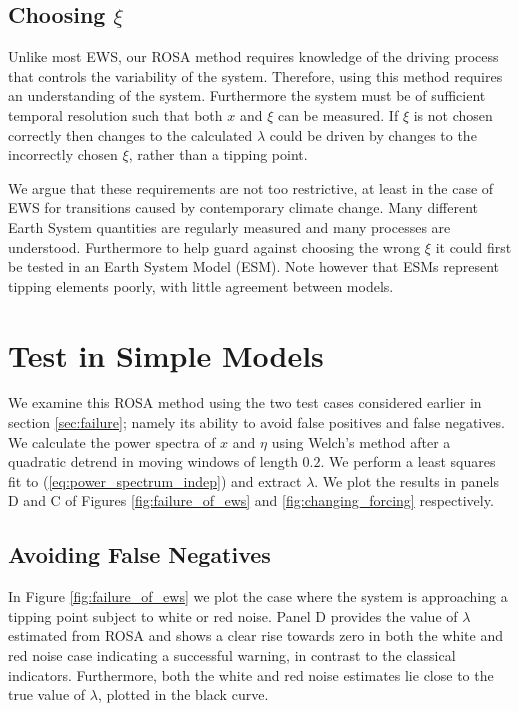 \subsection{Choosing $\xi$}
Unlike most EWS, our ROSA method requires knowledge of
the driving process that controls the variability of the system.
Therefore, using this method requires an understanding
of the system. Furthermore the system must be of sufficient temporal resolution such that 
both $x$ and $\xi$ can be measured. If $\xi$ is not chosen
correctly then changes to the calculated $\lambda$ could be driven
by changes to the incorrectly chosen $\xi$, rather than a 
tipping point. 

We argue that these requirements are not too restrictive, at least in the 
case of EWS for transitions caused by contemporary
climate change. Many different Earth System quantities are regularly 
measured and many processes are understood. Furthermore to help 
guard against choosing the wrong $\xi$ it could first be tested in an Earth System Model (ESM). Note however that ESMs represent tipping elements 
poorly, with little agreement between models\cite{Drijfhout2015}.


\section{Test in Simple Models}
We examine this ROSA method using the two test cases considered earlier in 
section \cref{sec:failure}; namely its ability to avoid 
false positives and false negatives.
We calculate the power spectra of $x$ and $\eta$
using Welch's method\cite{Welch1967} after a quadratic 
detrend in moving windows of length $0.2$. We perform a least
squares fit to
(\cref{eq:power_spectrum_indep}) and extract $\lambda$. We plot
the results in panels D and C of Figures 
\cref{fig:failure_of_ews} and \cref{fig:changing_forcing} respectively.

\subsection{Avoiding False Negatives}
In Figure \cref{fig:failure_of_ews} we plot the case
where the system is approaching a tipping point
subject to white or red noise. Panel D provides
the value of $\lambda$ estimated from ROSA and shows a clear
rise towards zero in both the white and red noise case indicating
a successful warning, in contrast to the classical indicators. Furthermore, both the
white and red noise estimates lie close to the true value of 
$\lambda$, plotted in the black curve.


